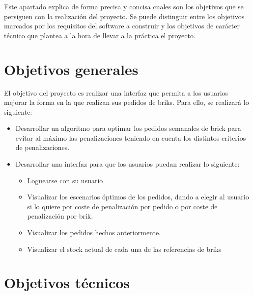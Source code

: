 
Este apartado explica de forma precisa y concisa cuales son los objetivos que se persiguen con la realización del proyecto. Se puede distinguir entre los objetivos marcados por los requisitos del software a construir y los objetivos de carácter técnico que plantea a la hora de llevar a la práctica el proyecto.


\section{Objetivos generales}
El objetivo del proyecto es realizar una interfaz que permita a los usuarios mejorar la forma en la que realizan sus pedidos de briks. Para ello, se realizará lo siguiente: 

\begin{itemize}

	\item Desarrollar un algoritmo para optimar los pedidos semanales de brick para evitar al máximo las penalizaciones teniendo en cuenta los distintos criterios de penalizaciones. 
	
	\item Desarrollar una interfaz para que los usuarios puedan realizar lo siguiente: 
\begin{itemize}

	\item Loguearse con su usuario

	\item Visualizar los escenarios óptimos de los pedidos, dando a elegir al usuario si lo quiere por coste de penalización por pedido o por coste de penalización por brik. 

	\item Visualizar los pedidos hechos anteriormente. 
	
	\item Visualizar el stock actual de cada una de las referencias de briks

\end{itemize}
\end{itemize}
\section{Objetivos técnicos}

